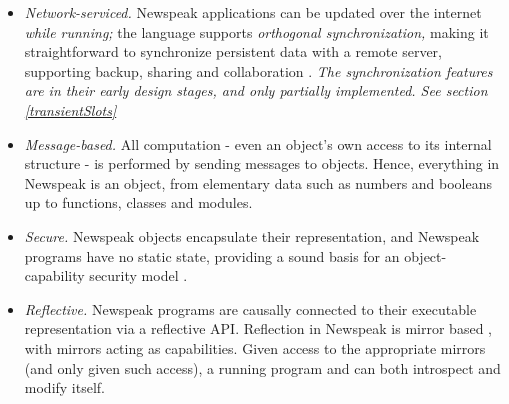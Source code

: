 \documentclass{article}
\begin{document}
\begin{itemize}
\item  {\em Network-serviced.} Newspeak applications can be updated over the internet {\em while running;} the language supports {\em orthogonal synchronization, } making it straightforward to synchronize persistent data with a remote server, supporting backup, sharing and collaboration \cite{bracha05}.
{\it
The synchronization features are in their early design stages, and only partially implemented. See section \ref{transientSlots}
}
\item  {\em Message-based.}  All computation  - even an object's own access to its internal structure - is performed by sending messages to objects. Hence, everything in Newspeak is an object, from elementary data such as numbers and booleans up to functions, classes and modules.
\item  {\em Secure.} Newspeak objects encapsulate their representation, and Newspeak programs have no static state, providing a sound basis for an object-capability security model \cite{RobustComposition}.

\item  {\em Reflective.} Newspeak programs are causally connected to their executable representation via a reflective API. Reflection in Newspeak is mirror based \cite{bracha-ungar04}, with mirrors acting as capabilities.   Given access to the appropriate mirrors (and only given such access), a running program and can both introspect and modify itself. 


\end{itemize}
\end{document}
